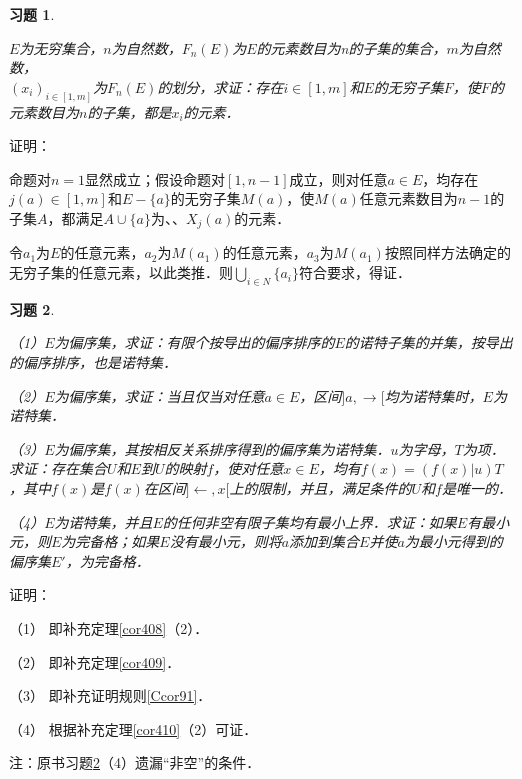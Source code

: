 \documentclass[12pt, a4paper, oneside]{book}
\newtheorem{exer}{习题}
\begin{document}
			\begin{exer}\label{exer183}
				\hfill\par
				$E$为无穷集合，$n$为自然数，$F_n(E)$为$E$的元素数目为n的子集的集合，$m$为自然数，\\$(x_i)_{i\in [1, m]}$为$F_n(E)$的划分，求证：存在$i\in [1, m]$和$E$的无穷子集$F$，使$F$的元素数目为$n$的子集，都是$x_i$的元素．
			\end{exer}
			证明：
			\par
			命题对$n=1$显然成立；假设命题对$[1, n-1]$成立，则对任意$a\in E$，均存在$j(a)\in [1, m]$和$E-\{a\}$的无穷子集$M(a)$，使$M(a)$任意元素数目为$n-1$的子集$A$，都满足$A\cup\{a\}$为、、$X_j(a)$的元素．
			\par
			令$a_1$为$E$的任意元素，$a_2$为$M(a_1)$的任意元素，$a_3$为$M(a_1)$按照同样方法确定的无穷子集的任意元素，以此类推．则$\bigcup\limits_{i\in N}\{a_i\}$符合要求，得证．
			
			\begin{exer}\label{exer184}
				\hfill\par
				（1）$E$为偏序集，求证：有限个按导出的偏序排序的$E$的诺特子集的并集，按导出的偏序排序，也是诺特集．
				\par
				（2）$E$为偏序集，求证：当且仅当对任意$a\in E$，区间$]a, \to [$均为诺特集时，$E$为诺特集．
				\par
				（3）$E$为偏序集，其按相反关系排序得到的偏序集为诺特集．$u$为字母，$T$为项．求证：存在集合$U$和$E$到$U$的映射$f$，使对任意$x\in E$，均有$f(x)=(f(x)|u)T$，其中$f(x)$是$f(x)$在区间$]\gets, x[$上的限制，并且，满足条件的$U$和$f$是唯一的．
				\par
				（4）$E$为诺特集，并且$E$的任何非空有限子集均有最小上界．求证：如果$E$有最小元，则$E$为完备格；如果$E$没有最小元，则将$a$添加到集合$E$并使$a$为最小元得到的偏序集$E'$，为完备格．
			\end{exer}
			证明：
			\par
			（1）	即补充定理\ref{cor408}（2）．
			\par
			（2）	即补充定理\ref{cor409}．
			\par
			（3）	即补充证明规则\ref{Ccor91}．
			\par
			（4）	根据补充定理\ref{cor410}（2）可证．
			\par
			注：原书习题\ref{exer184}（4）遗漏“非空”的条件．
			
\end{document}
